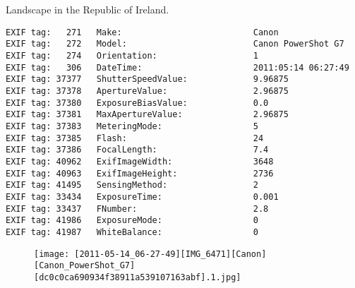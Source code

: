 \section{\protect{}}
\noindent Landscape in the Republic of Ireland.
\noindent
\begin{lstlisting}
EXIF tag:   271   Make:                          Canon
EXIF tag:   272   Model:                         Canon PowerShot G7
EXIF tag:   274   Orientation:                   1
EXIF tag:   306   DateTime:                      2011:05:14 06:27:49
EXIF tag: 37377   ShutterSpeedValue:             9.96875
EXIF tag: 37378   ApertureValue:                 2.96875
EXIF tag: 37380   ExposureBiasValue:             0.0
EXIF tag: 37381   MaxApertureValue:              2.96875
EXIF tag: 37383   MeteringMode:                  5
EXIF tag: 37385   Flash:                         24
EXIF tag: 37386   FocalLength:                   7.4
EXIF tag: 40962   ExifImageWidth:                3648
EXIF tag: 40963   ExifImageHeight:               2736
EXIF tag: 41495   SensingMethod:                 2
EXIF tag: 33434   ExposureTime:                  0.001
EXIF tag: 33437   FNumber:                       2.8
EXIF tag: 41986   ExposureMode:                  0
EXIF tag: 41987   WhiteBalance:                  0

\end{lstlisting}
\clearpage
\begin{figure}
\raggedleft
\texttt{[image: [2011-05-14\_06-27-49][IMG\_6471][Canon][Canon\_PowerShot\_G7][dc0c0ca690934f38911a539107163abf].1.jpg]}
\end{figure}


\clearpage
